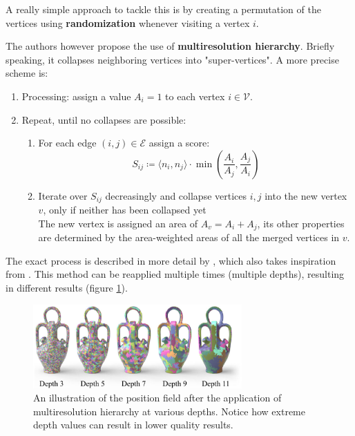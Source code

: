 \documentclass{ACGSeminar}
\begin{document}
A really simple approach to tackle this is by creating a permutation of the vertices using \textbf{randomization} whenever visiting a vertex $i$.

The authors however propose the use of \textbf{multiresolution hierarchy}. Briefly speaking, it collapses neighboring vertices into "super-vertices". A more precise scheme is:
\begin{enumerate}
	\item	Processing: assign a value $A_i = 1$ to each vertex $i \in \mathcal{V}$.
	\item	Repeat, until no collapses are possible:
			\begin{enumerate}
				\item	For each edge $(i,j) \in \mathcal{E}$ assign a score:
						\begin{equation*}
							S_{ij} \coloneqq \langle n_i, n_j \rangle \cdot \min(\frac{A_i}{A_j}, \frac{A_j}{A_i})
						\end{equation*}
				\item	Iterate over $S_{ij}$ decreasingly and collapse vertices $i,j$ into the new vertex $v$, only if neither has been collapsed yet\\
						The new vertex is assigned an area of $A_v = A_i + A_j$, its other properties are determined by the area-weighted areas of all the merged vertices in $v$.
			\end{enumerate}
\end{enumerate}
The exact process is described in more detail by \cite{jakob2015instant}, which also takes inspiration from \cite{botsch2006primo}. This method can be reapplied multiple times (multiple depths), resulting in different results (figure \ref{fig:multireolution-hierarchy-depths}).

\begin{figure}[htb!]
	\begin{centering}
		\includegraphics[width=8cm]{img/multiresolution-hierarchy-depths.png}\par
	\end{centering}
	\caption{An illustration of the position field after the application of multiresolution hierarchy at various depths. Notice how extreme depth values can result in lower quality results. \cite{jakob2015instant}}
	\label{fig:multireolution-hierarchy-depths}
\end{figure}
\end{document}
